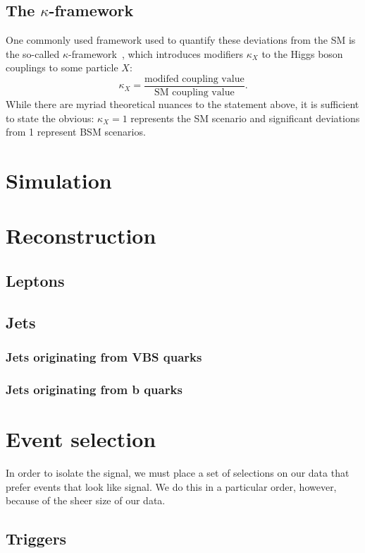 \subsection{The $\kappa$-framework}
One commonly used framework used to quantify these deviations from the SM is the so-called $\kappa$-framework~\cite{KFrame}, which introduces modifiers $\kappa_X$ to the Higgs boson couplings to some particle $X$:
\begin{equation}
    \kappa_X = \frac{\text{modifed coupling value}}{\text{SM coupling value}}.
\end{equation}
While there are myriad theoretical nuances to the statement above, it is sufficient to state the obvious: $\kappa_X = 1$ represents the SM scenario and significant deviations from 1 represent BSM scenarios. 

\section{Simulation}

\section{Reconstruction}
\subsection{Leptons}
\subsection{Jets}
\subsubsection{Jets originating from VBS quarks}
\subsubsection{Jets originating from b quarks}

\section{Event selection}
In order to isolate the signal, we must place a set of selections on our data that prefer events that look like signal. 
We do this in a particular order, however, because of the sheer size of our data. 
\subsection{Triggers}
